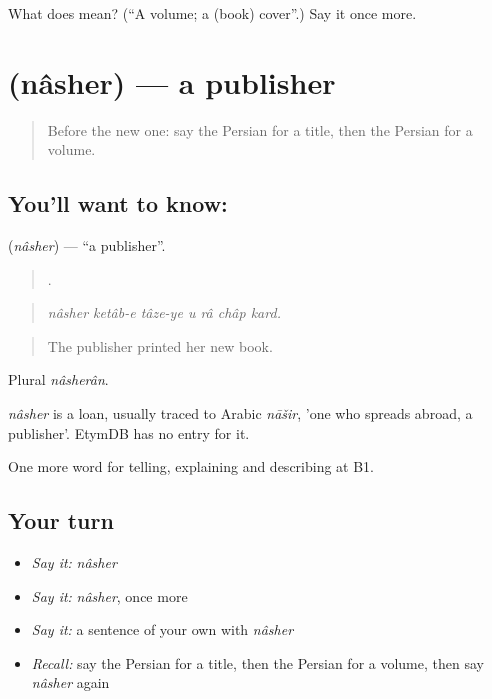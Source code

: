 \begin{tcolorbox}[breakable,colback=teal!4,colframe=teal!35!black,title={Before you move on}]
What does  mean? (\textquotedblleft{}A volume; a (book) cover\textquotedblright{}.) Say it once more.
\end{tcolorbox}
\section[\texorpdfstring{\fa{ناشر} (nâsher)}{ناشر (nâsher)}]{ (nâsher) — a publisher}

\label{lesson:FA-C528-nasher}



\begin{quote}
Before the new one: say the Persian for a title, then the Persian for a volume.
\end{quote}

\subsection*{You'll want to know: }
\textbf{} (\emph{nâsher}) — \textquotedblleft{}a publisher\textquotedblright{}.

\begin{quote}
      .
\end{quote}

\begin{quote}
\emph{nâsher ketâb-e tâze-ye u râ châp kard.}
\end{quote}

\begin{quote}
The publisher printed her new book.
\end{quote}

Plural \emph{nâsherân}.

\begin{cousinweb}
\emph{nâsher} is a loan, usually traced to Arabic \emph{nāšir}, 'one who spreads abroad, a publisher'. EtymDB has no entry for it.
\end{cousinweb}

\begin{grammarlens}[title={What you've built}]
One more word for telling, explaining and describing at B1.
\end{grammarlens}

\subsection*{Your turn}
\begin{itemize}
\raggedright
  \item \emph{Say it:} \emph{nâsher}
  \item \emph{Say it:} \emph{nâsher}, once more
  \item \emph{Say it:} a sentence of your own with \emph{nâsher}
  \item \emph{Recall:} say the Persian for a title, then the Persian for a volume, then say \emph{nâsher} again
\end{itemize}

